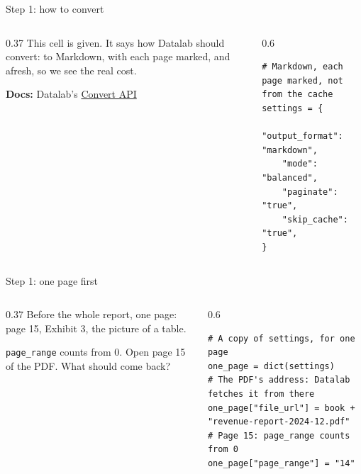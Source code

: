 \documentclass[9pt,aspectratio=169]{beamer}
\begin{document}
\begin{frame}[fragile]{Step 1: how to convert}
    \begin{columns}[T]
        \begin{column}{0.37\textwidth}
            This cell is given. It says how Datalab should convert: to Markdown, with each page marked, and afresh, so we see the real cost.

            \medskip
            {\scriptsize\textbf{Docs:} Datalab's \href{https://documentation.datalab.to/docs/recipes/conversion/conversion-api-overview}{Convert API}\par}
        \end{column}
        \begin{column}{0.6\textwidth}
\begin{lstlisting}
# Markdown, each page marked, not from the cache
settings = {
    "output_format": "markdown",
    "mode": "balanced",
    "paginate": "true",
    "skip_cache": "true",
}
\end{lstlisting}
        \end{column}
    \end{columns}
\end{frame}

\begin{frame}[fragile]{Step 1: one page first}
    \begin{columns}[T]
        \begin{column}{0.37\textwidth}
            Before the whole report, one page: page 15, Exhibit 3, the picture of a table.

            \medskip
            \texttt{page\_range} counts from 0. Open page 15 of the PDF. What should come back?
        \end{column}
        \begin{column}{0.6\textwidth}
\begin{lstlisting}
# A copy of settings, for one page
one_page = dict(settings)
# The PDF's address: Datalab fetches it from there
one_page["file_url"] = book + "revenue-report-2024-12.pdf"
# Page 15: page_range counts from 0
one_page["page_range"] = "14"
\end{lstlisting}
        \end{column}
    \end{columns}
\end{frame}
\end{document}
